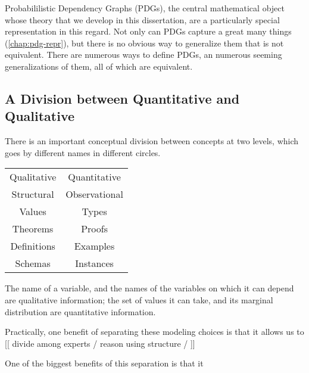 %
%
Probabililistic Dependency Graphs (PDGs), the central mathematical object whose theory that we develop in this dissertation, are a particularly special representation in this regard. 
Not only can PDGs capture a great many things (\cref{chap:pdg-repr}), but there is no obvious way to generalize them that is not equivalent. 
There are numerous ways to define PDGs, an numerous seeming generalizations of them, all of which are equivalent. 



\subsection{A Division between Quantitative and Qualitative}

There is an important conceptual division between concepts at two levels,
which goes by different names in different circles. 

\begin{center}
\begin{tabular}{c|c}
    Qualitative & Quantitative \\ 
    Structural & Observational \\
    Values & Types \\ 
    Theorems & Proofs \\
    Definitions & Examples \\
    Schemas & Instances 
\end{tabular}
\end{center}

The name of a variable, and the names of the variables on which it can depend are qualitative information; the set of values it can take, and its marginal distribution are quantitative information. 

Practically, one benefit of separating these modeling choices is that it allows us to  [[ divide among experts / reason using structure /  ]]

One of the biggest benefits of this separation is that it 

